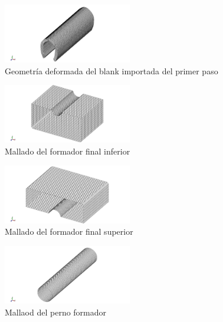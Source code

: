 \begin{figure}[!h]
\centering
\includegraphics[width=0.5\textwidth]{src/ch3/mesh_blank_02.png}
\caption{Geometría deformada del blank importada del primer paso}
\label{fig:mesh_blank_02}
\end{figure}

\begin{figure}[!h]
\centering
\includegraphics[width=0.5\textwidth]{src/ch3/mesh_ffi.png}
\caption{Mallado del formador final inferior}
\label{fig:mesh_ffi}
\end{figure}

\begin{figure}[!h]
\centering
\includegraphics[width=0.5\textwidth]{src/ch3/mesh_ffs.png}
\caption{Mallado del formador final superior}
\label{fig:mesh_ffs}
\end{figure}

\begin{figure}[!h]
\centering
\includegraphics[width=0.5\textwidth]{src/ch3/mesh_perno.png}
\caption{Mallaod del perno formador}
\label{fig:mesh_perno}
\end{figure}


